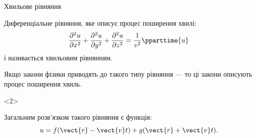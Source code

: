 \documentclass[onlytextwidth]{beamer}
\begin{document}
\begin{frame}{Хвильове рівняння}{}
	\begin{block}{}\justifying
		Диференціальне рівняння, яке описує процес поширення хвилі:
		\begin{equation*}
			\frac{\partial^2 u}{\partial x^2} + \frac{\partial^2 u}{\partial y^2} + \frac{\partial^2 u}{\partial z^2}= \frac1{v^2}\pparttime{u}
		\end{equation*}
		і називається \alert{хвильовим рівнянням}.
	\end{block}
	\begin{alertblock}{}\centering
		Якщо закони фізики приводять до такого типу рівняння --- то ці закони описують процес поширення хвиль.
	\end{alertblock}
	\begin{onlyenv}
		\begin{block}{}
			Загальним розв'язком такого рівняння є функція:
			\begin{equation*}
				u = f(\vect{r} - \vect{v}t) + g(\vect{r} + \vect{v}t).
			\end{equation*}
		\end{block}
	\end{onlyenv}

\end{frame}
\end{document}
